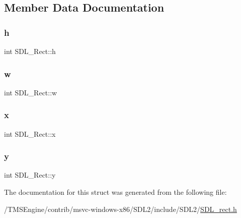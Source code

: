\subsection{Member Data Documentation}
\mbox{\label{struct_s_d_l___rect_a0a17d46b320af8063b746153348edd72}} 
\subsubsection{\texorpdfstring{h}{h}}
{\footnotesize\ttfamily int S\+D\+L\+\_\+\+Rect\+::h}

\mbox{\label{struct_s_d_l___rect_a56b7be5738fb6fab86881534a814c45e}} 
\subsubsection{\texorpdfstring{w}{w}}
{\footnotesize\ttfamily int S\+D\+L\+\_\+\+Rect\+::w}

\mbox{\label{struct_s_d_l___rect_a85418d94621dd6855805c4b5c7bf6482}} 
\subsubsection{\texorpdfstring{x}{x}}
{\footnotesize\ttfamily int S\+D\+L\+\_\+\+Rect\+::x}

\mbox{\label{struct_s_d_l___rect_a822694af8ddca5fd0d5d94e47106ab85}} 
\subsubsection{\texorpdfstring{y}{y}}
{\footnotesize\ttfamily int S\+D\+L\+\_\+\+Rect\+::y}



The documentation for this struct was generated from the following file\+:\begin{DoxyCompactItemize}
\item 
/\+T\+M\+S\+Engine/contrib/msvc-\/windows-\/x86/\+S\+D\+L2/include/\+S\+D\+L2/\hyperlink{_s_d_l__rect_8h}{S\+D\+L\+\_\+rect.\+h}\end{DoxyCompactItemize}
